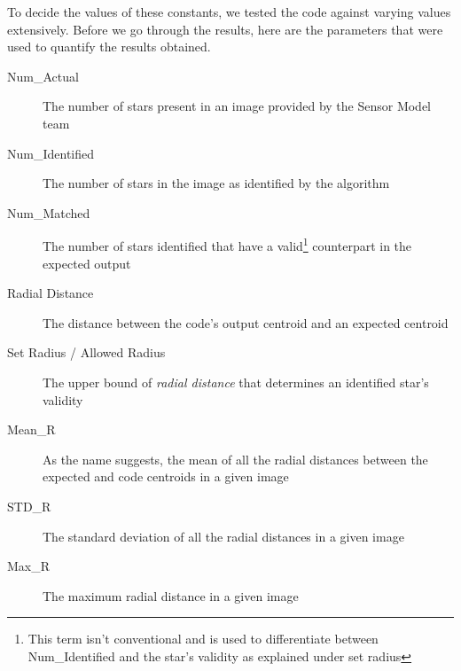 \documentclass[../../main.tex]{subfiles}
\begin{document}
		To decide the values of these constants, we tested the code against varying values extensively. Before we go through the results, here are the parameters that were used to quantify the results obtained.

		\begin{description}
			\item [Num\_Actual] The number of stars present in an image provided by the Sensor Model team
			\item [Num\_Identified] The number of stars in the image as identified by the algorithm
			\item [Num\_Matched] The number of stars identified that have a valid\footnote{This term isn't conventional and is used to differentiate between Num\_Identified and the star's validity as explained under set radius} counterpart in the expected output
			\item [Radial Distance] The distance between the code’s output centroid and an expected centroid
			\item [Set Radius / Allowed Radius] The upper bound of \emph{radial distance} that determines an identified star's validity
			\item [Mean\_R] As the name suggests, the mean of all the radial distances between the expected and code centroids in a given image
			\item [STD\_R] The standard deviation of all the radial distances in a given image
			\item [Max\_R] The maximum radial distance in a given image
		\end{description}
\end{document}
